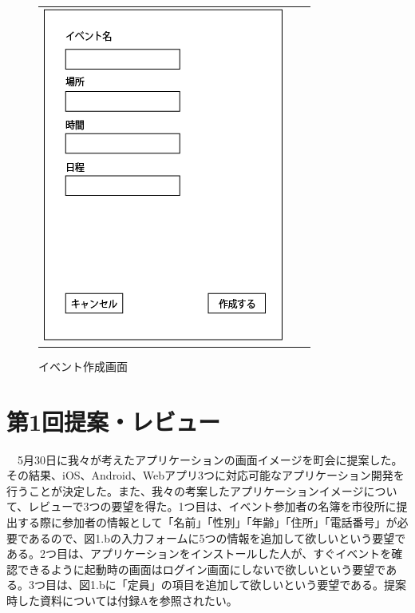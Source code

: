 \begin{figure}[h]
\begin{tabular}{ccc}
\begin{minipage}[t]{0.33\hsize}
        \caption{参加フォーム画面}
        \label{joinform}
      \end{minipage}
      \begin{minipage}[t]{0.33\hsize}
        \centering
        \includegraphics[keepaspectratio, scale=0.4]{process_figures/old_create_event.png}
        \caption{イベント作成画面}
        \label{create_event.old}
      \end{minipage}
    \end{tabular}
\end{figure}
\section{第1回提案・レビュー}
　5月30日に我々が考えたアプリケーションの画面イメージを町会に提案した。その結果、iOS、Android、Webアプリ3つに対応可能なアプリケーション開発を行うことが決定した。また、我々の考案したアプリケーションイメージについて、レビューで3つの要望を得た。1つ目は、イベント参加者の名簿を市役所に提出する際に参加者の情報として「名前」「性別」「年齢」「住所」「電話番号」が必要であるので、図1.bの入力フォームに5つの情報を追加して欲しいという要望である。2つ目は、アプリケーションをインストールした人が、すぐイベントを確認できるように起動時の画面はログイン画面にしないで欲しいという要望である。3つ目は、図1.bに「定員」の項目を追加して欲しいという要望である。提案時した資料については付録Aを参照されたい。
